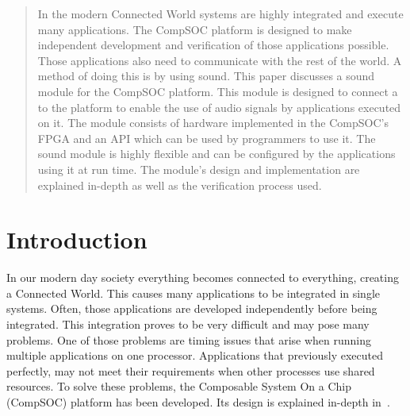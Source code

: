 


\begin{abstract}
In the modern Connected World systems are highly integrated and execute many applications. The CompSOC platform is designed to make independent development and verification of those applications possible. Those applications also need to communicate with the rest of the world. A method of doing this is by using sound. This paper discusses a sound module for the CompSOC platform. This module is designed to connect a \digipmod to the platform to enable the use of audio signals by applications executed on it. The module consists of hardware implemented in the CompSOC's FPGA and an API which can be used by programmers to use it. The sound module is highly flexible and can be configured by the applications using it at run time. The module's design and implementation are explained in-depth as well as the verification process used.
\end{abstract}

\IEEEpeerreviewmaketitle

\IEEEpubidadjcol


\section{Introduction}
In our modern day society everything becomes connected to everything, creating a Connected World. This causes many applications to be integrated in single systems. Often, those applications are developed independently before being integrated. This integration proves to be very difficult and may pose many problems. One of those problems are timing issues that arise when running multiple applications on one processor. Applications that previously executed perfectly, may not meet their requirements when other processes use shared resources. To solve these problems, the Composable System On a Chip (CompSOC) platform has been developed. Its design is explained in-depth in~\cite{goossens2013virtual}.

